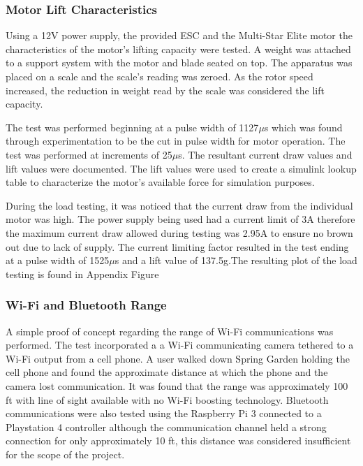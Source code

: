  \subsubsection{Motor Lift Characteristics}
 
 Using a 12V power supply, the provided ESC and the Multi-Star Elite motor the characteristics of the motor's lifting capacity were tested. A weight was attached to a support system with the motor and blade seated on top. The apparatus was placed on a scale and the scale's reading was zeroed. As the rotor speed increased, the reduction in weight read by the scale was considered the lift capacity.
 
 The test was performed beginning at a pulse width of 1127$\mu$s which was found through experimentation to be the cut in pulse width for motor operation. The test was performed at increments of 25$\mu$s. The resultant current draw values and lift values were documented. The lift values were used to create a simulink lookup table to characterize the motor's available force for simulation purposes. 
 
 During the load testing, it was noticed that the current draw from the individual motor was high. The power supply being used had a current limit of 3A therefore the maximum current draw allowed during testing was 2.95A to ensure no brown out due to lack of supply. The current limiting factor resulted in the test ending at a pulse width of 1525$\mu$s and a lift value of 137.5g.The resulting plot of the load testing is found in Appendix Figure %

  \subsubsection{Wi-Fi and Bluetooth Range}
  
  A simple proof of concept regarding the range of Wi-Fi communications was performed. The test incorporated a a Wi-Fi communicating camera tethered to a Wi-Fi output from a cell phone. A user walked down Spring Garden holding the cell phone and found the approximate distance at which the phone and the camera lost communication. It was found that the range was approximately 100 ft with line of sight available with no Wi-Fi boosting technology. Bluetooth communications were also tested using the Raspberry Pi 3 connected to a Playstation 4 controller although the communication channel held a strong connection for only approximately 10 ft, this distance was considered insufficient for the scope of the project.
  
